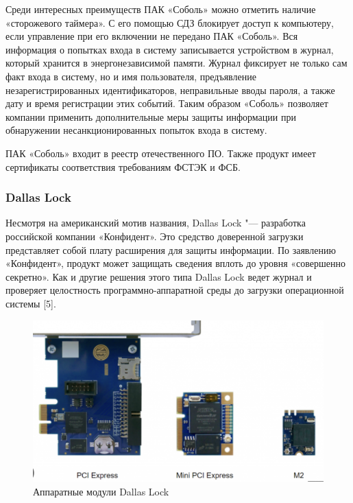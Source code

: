 Среди интересных преимуществ ПАК «Соболь» можно отметить наличие «сторожевого таймера». 
С его помощью СДЗ блокирует доступ к компьютеру, если управление при его включении 
не передано ПАК «Соболь». Вся информация о попытках входа в систему записывается 
устройством в журнал, который хранится в энергонезависимой памяти. Журнал фиксирует 
не только сам факт входа в систему, но и имя пользователя, предъявление незарегистрированных 
идентификаторов, неправильные вводы пароля, а также дату и время регистрации этих событий.
 Таким образом «Соболь» позволяет компании применить дополнительные меры защиты информации
 при обнаружении несанкционированных попыток входа в систему.

ПАК «Соболь» входит в реестр отечественного ПО. Также продукт имеет сертификаты соответствия
требованиям ФСТЭК и ФСБ.



\subsubsection{Dallas Lock}

Несмотря на американский мотив названия, Dallas Lock "--- разработка российской компании 
«Конфидент». Это средство доверенной загрузки представляет собой плату расширения 
для защиты информации. По заявлению «Конфидент», продукт может защищать сведения вплоть 
до уровня «совершенно секретно». Как и другие решения этого типа Dallas Lock ведет журнал 
и проверяет целостность программно-аппаратной среды до загрузки операционной системы [5].

\begin{figure}[H]
  \centering
  \includegraphics[width=1\textwidth]{pict/14}
  \caption{Аппаратные модули Dallas Lock}
  \label{fig:59}
\end{figure}

